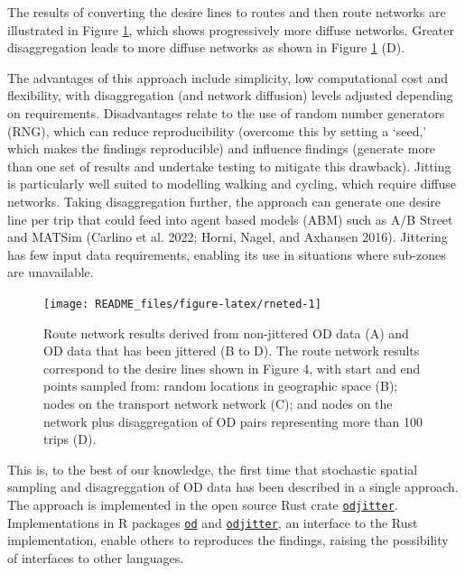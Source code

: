 \documentclass[
]{article}
\begin{document}
The results of converting the desire lines to routes and then route networks are illustrated in Figure \ref{fig:rneted}, which shows progressively more diffuse networks.
Greater disaggregation leads to more diffuse networks as shown in Figure \ref{fig:rneted} (D).

The advantages of this approach include simplicity, low computational cost and flexibility, with disaggregation (and network diffusion) levels adjusted depending on requirements.
Disadvantages relate to the use of random number generators (RNG), which can reduce reproducibility (overcome this by setting a `seed,' which makes the findings reproducible) and influence findings (generate more than one set of results and undertake testing to mitigate this drawback).
Jitting is particularly well suited to modelling walking and cycling, which require diffuse networks.
Taking disaggregation further, the approach can generate one desire line per trip that could feed into agent based models (ABM) such as A/B Street and MATSim (Carlino et al. 2022; Horni, Nagel, and Axhausen 2016).
Jittering has few input data requirements, enabling its use in situations where sub-zones are unavailable.

\begin{figure}

{\centering \texttt{[image: README\_files/figure-latex/rneted-1]} 

}

\caption{Route network results derived from non-jittered OD data (A) and OD data that has been jittered (B to D). The route network results correspond to the desire lines shown in Figure 4, with start and end points sampled from: random locations in geographic space (B); nodes on the transport network network (C); and nodes on the network plus disaggregation of OD pairs representing more than 100 trips (D).}\label{fig:rneted}
\end{figure}

This is, to the best of our knowledge, the first time that stochastic spatial sampling and disagreggation of OD data has been described in a single approach.
The approach is implemented in the open source Rust crate \href{https://github.com/dabreegster/odjitter}{\texttt{odjitter}}.
Implementations in R packages \href{https://itsleeds.github.io/od/}{\texttt{od}} and \href{https://github.com/dabreegster/odjitter/tree/main/r}{\texttt{odjitter}}, an interface to the Rust implementation, enable others to reproduces the findings, raising the possibility of interfaces to other languages.
\end{document}
